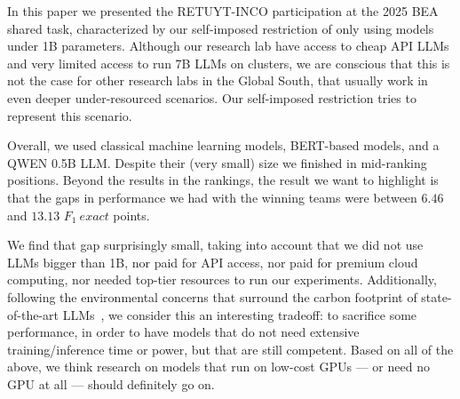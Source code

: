\documentclass[11pt]{article}
\begin{document}
In this paper we presented the RETUYT-INCO participation at the 2025 BEA shared task, characterized by our self-imposed restriction of only using models under 1B parameters.
Although our research lab have access to cheap API LLMs and very limited access to run 7B LLMs on clusters, we are conscious that this is not the case for other research labs in the Global South, that usually work in even deeper under-resourced scenarios.
Our self-imposed restriction tries to represent this scenario.

Overall, we used classical machine learning models, BERT-based models, and a QWEN 0.5B LLM.
Despite their (very small) size we finished in mid-ranking positions.
Beyond the results in the rankings, the result we want to highlight is that the gaps in performance we had with the winning teams were between $6.46$ and $13.13$ $F_1\ exact$ points.

We find that gap surprisingly small, taking into account that we did not use LLMs bigger than 1B, nor paid for API access, nor paid for premium cloud computing, nor needed top-tier resources to run our experiments.
Additionally, following the environmental concerns that surround the carbon footprint of state-of-the-art LLMs~\citep{luccioni2023estimating,faizllmcarbon,liu2024green}, we consider this an interesting tradeoff: to sacrifice some performance, in order to have models that do not need extensive training/inference time or power, but that are still competent.
Based on all of the above, we think research on models that run on low-cost GPUs --- or need no GPU at all --- should definitely go on.


\end{document}
